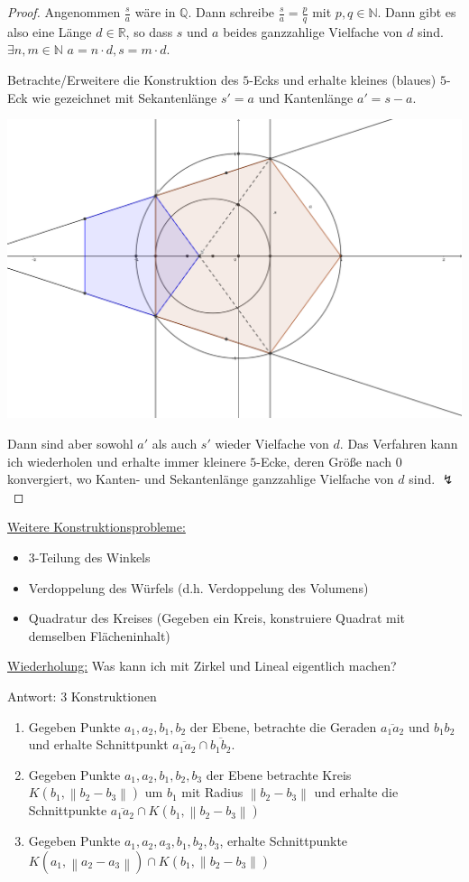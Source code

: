 \documentclass[12pt,parskip=full]{scrartcl}
\newcommand{\setN}{\mathbb{N}}
\newcommand{\setQ}{\mathbb{Q}}
\newcommand{\setR}{\mathbb{R}}
\newcommand{\dabs}[1]{{\left\lVert #1 \right\rVert}}
\newcommand{\heading}{\underline}
\theoremstyle{definition}
\theoremstyle{remark}
\begin{document}
	\begin{proof}
		Angenommen $\frac{s}{a}$ wäre in $\setQ$. Dann schreibe $\frac{s}{a} = \frac{p}{q}$ mit $p,q \in \setN$. Dann gibt es also eine Länge $d \in \setR$, so dass $s$ und $a$ beides ganzzahlige Vielfache von $d$ sind. $\exists n,m \in \setN$  $a = n \cdot d, s= m \cdot d$.
		
		Betrachte/Erweitere die Konstruktion des $5$-Ecks und erhalte kleines (blaues) $5$-Eck wie gezeichnet mit Sekantenlänge $s' = a$ und Kantenlänge $a' = s - a$.
		
		\begin{center}
			\includegraphics[width=0.8\linewidth]{bilder/bild2.png}
		\end{center}
	
		Dann sind aber sowohl $a'$ als auch $s'$ wieder Vielfache von $d$. Das Verfahren kann ich wiederholen und erhalte immer kleinere $5$-Ecke, deren Größe nach $0$ konvergiert, wo Kanten- und Sekantenlänge ganzzahlige Vielfache von $d$ sind. $\lightning$
	\end{proof}

	\heading{Weitere Konstruktionsprobleme:}
	\begin{itemize}
		\item $3$-Teilung des Winkels
		\item Verdoppelung des Würfels (d.h. Verdoppelung des Volumens)
		\item Quadratur des Kreises (Gegeben ein Kreis, konstruiere Quadrat mit demselben Flächeninhalt)
	\end{itemize}

	\heading{Wiederholung:} Was kann ich mit Zirkel und Lineal eigentlich machen?
	
	Antwort: $3$ Konstruktionen
	\begin{enumerate}
		\item Gegeben Punkte $a_1, a_2, b_1, b_2$ der Ebene, betrachte die Geraden $\overline{a_1 a_2}$ und $b_1 b_2$ und erhalte Schnittpunkt $\overline{a_1 a_2} \cap \overline{b_1 b_2}$.
		\item Gegeben Punkte $a_1, a_2, b_1, b_2, b_3$ der Ebene betrachte Kreis $K(b_1, \dabs{b_2 - b_3})$ um $b_1$ mit Radius $\dabs{b_2 - b_3}$ und erhalte die Schnittpunkte $\overline{a_1 a_2} \cap K(b_1, \dabs{b_2 - b_3})$
		\item Gegeben Punkte $a_1, a_2, a_3, b_1, b_2, b_3$, erhalte Schnittpunkte $K(a_1, \dabs{a_2 - a_3}) \cap K(b_1, \dabs{b_2 - b_3})$
	\end{enumerate}
\end{document}
